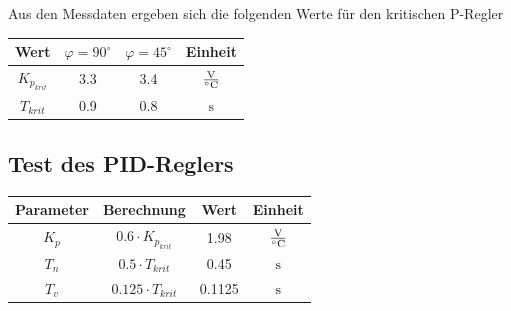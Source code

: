 Aus den Messdaten ergeben sich die folgenden Werte für den kritischen P-Regler
\begin{table}[h!]
	\centering
	\begin{tabular}{c c c c}
		Wert
			& $\varphi = 90^\circ$
			& $\varphi = 45^\circ$
			& Einheit \\
		\hline 
		$K_{p_{krit}}$
			& 3.3
			& 3.4
			& $\si[per-mode=fraction]{\volt\per\celsius}$ \\
		$T_{krit}$
			& 0.9
			& 0.8
			& $\si{\second}$
	\end{tabular}
\end{table}

\subsection{Test des PID-Reglers}

\begin{table}[h!]
	\centering
	\begin{tabular}{c c c c}
		Parameter
			& Berechnung
			& Wert
			& Einheit \\
		\hline
		$K_p$
			& $0.6 \cdot K_{p_{krit}}$
			& 1.98
			& $\si[per-mode=fraction]{\volt\per\celsius}$ \\
		$T_n$
			& $0.5 \cdot T_{krit}$
			& 0.45
			& $\si{\second}$ \\
		$T_v$
			& $0.125 \cdot T_{krit}$
			& 0.1125
			& $\si{\second}$
	\end{tabular}
\end{table}

